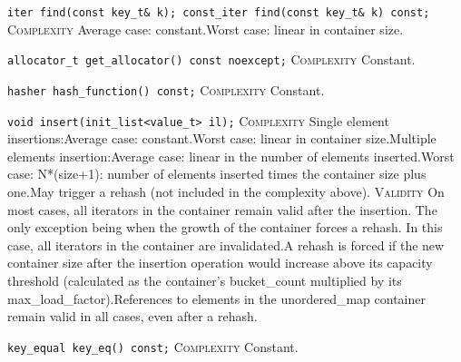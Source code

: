 \noindent{}\hspace*{0.25em}\lstinline[basicstyle=\ttfamily\color{corange}]{iter find(const key_t& k); const_iter find(const key_t& k) const;} \textsc{Complexity} Average case: constant.Worst case: linear in container size.\\\vspace{-0.6em}

\noindent{}\hspace*{0.25em}\lstinline[basicstyle=\ttfamily\color{cgreen}]{allocator_t get_allocator() const noexcept;} \textsc{Complexity} Constant.\\\vspace{-0.6em}

\noindent{}\hspace*{0.25em}\lstinline[basicstyle=\ttfamily\color{cgreen}]{hasher hash_function() const;} \textsc{Complexity} Constant.\\\vspace{-0.6em}

\noindent{}\hspace*{0.25em}\lstinline[basicstyle=\ttfamily\color{corange}]{void insert(init_list<value_t> il);} \textsc{Complexity} Single element insertions:Average case: constant.Worst case: linear in container size.Multiple elements insertion:Average case: linear in the number of elements inserted.Worst case: N*(size+1): number of elements inserted times the container size plus one.May trigger a rehash (not included in the complexity above). \textsc{Validity} On most cases, all iterators in the container remain valid after the insertion. The only exception being when the growth of the container forces a rehash. In this case, all iterators in the container are invalidated.A rehash is forced if the new container size after the insertion operation would increase above its capacity threshold (calculated as the container's bucket\_count multiplied by its max\_load\_factor).References to elements in the unordered\_map container remain valid in all cases, even after a rehash.\\\vspace{-0.6em}

\noindent{}\hspace*{0.25em}\lstinline[basicstyle=\ttfamily\color{cgreen}]{key_equal key_eq() const;} \textsc{Complexity} Constant.\\\vspace{-0.6em}

